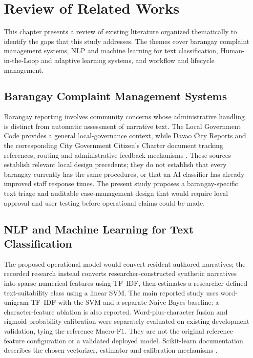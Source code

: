 \chapter{Review of Related Works}

This chapter presents a review of existing literature organized thematically to identify the gaps that this study addresses. The themes cover barangay complaint management systems, NLP and machine learning for text classification, Human-in-the-Loop and adaptive learning systems, and workflow and lifecycle management.

\section{Barangay Complaint Management Systems}
Barangay reporting involves community concerns whose administrative handling is distinct from automatic assessment of narrative text. The Local Government Code provides a general local-governance context, while Davao City Reports and the corresponding City Government Citizen's Charter document tracking references, routing and administrative feedback mechanisms \cite{ra7160,dcr}. These sources establish relevant local design precedents; they do not establish that every barangay currently has the same procedures, or that an AI classifier has already improved staff response times. The present study proposes a barangay-specific text triage and auditable case-management design that would require local approval and user testing before operational claims could be made.

\section{NLP and Machine Learning for Text Classification}
The proposed operational model would convert resident-authored narratives; the recorded research instead converts researcher-constructed synthetic narratives into sparse numerical features using TF--IDF, then estimates a researcher-defined text-suitability class using a linear SVM. The main reported study uses word-unigram TF--IDF with the SVM and a separate Naive Bayes baseline; a character-feature ablation is also reported. Word-plus-character fusion and sigmoid probability calibration were separately evaluated on existing development validation, tying the reference Macro-F1. They are not the original reference feature configuration or a validated deployed model. Scikit-learn documentation describes the chosen vectorizer, estimator and calibration mechanisms \cite{sklearn,sklearntfidf,sklearncalib}.

